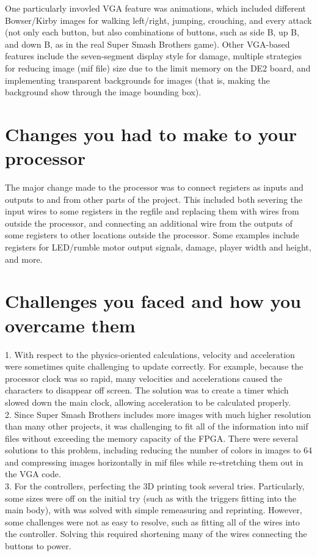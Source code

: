 \documentclass[12pt]{article} %
\begin{document}
One particularly invovled VGA feature was animations, which included different Bowser/Kirby images for walking left/right, jumping, crouching, and every attack (not only each button, but also combinations of buttons, such as side B, up B, and down B, as in the real Super Smash Brothers game). Other VGA-based features include the seven-segment display style for damage, multiple strategies for reducing image (mif file) size due to the limit memory on the DE2 board, and implementing transparent backgrounds for images (that is, making the background show through the image bounding box). 

\section{Changes you had to make to your processor}
The major change made to the processor was to connect registers as inputs and outputs to and from other parts of the project. This included both severing the input wires to some registers in the regfile and replacing them with wires from outside the processor, and connecting an additional wire from the outputs of some registers to other locations outside the processor. Some examples include registers for LED/rumble motor output signals, damage, player width and height, and more.\\

\section{Challenges you faced and how you overcame them}
1. With respect to the physics-oriented calculations, velocity and acceleration were sometimes quite challenging to update correctly. For example, because the processor clock was so rapid, many velocities and accelerations caused the characters to disappear off screen. The solution was to create a timer which slowed down the main clock, allowing acceleration to be calculated properly.\\

2. Since Super Smash Brothers includes more images with much higher resolution than many other projects, it was challenging to fit all of the information into mif files without exceeding the memory capacity of the FPGA. There were several solutions to this problem, including reducing the number of colors in images to 64 and compressing images horizontally in mif files while re-stretching them out in the VGA code.\\

3. For the controllers, perfecting the 3D printing took several tries. Particularly, some sizes were off on the initial try (such as with the triggers fitting into the main body), with was solved with simple remeasuring and reprinting. However, some challenges were not as easy to resolve, such as fitting all of the wires into the controller. Solving this required shortening many of the wires connecting the buttons to power.\\
\end{document}
